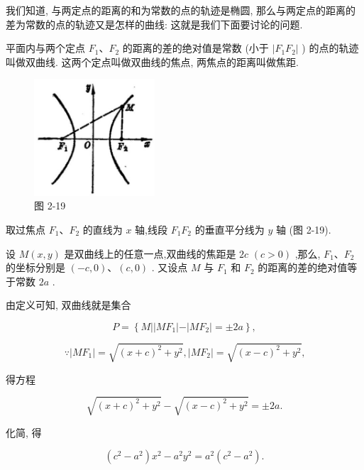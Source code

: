 \documentclass[lang=cn,newtx,10.5pt,scheme=chinese]{elegantbook}
\begin{document}
我们知道, 与两定点的距离的和为常数的点的轨迹是椭圆, 那么与两定点的距离的差为常数的点的轨迹又是怎样的曲线: 这就是我们下面要讨论的问题.
\begin{definition}[双曲线] 
平面内与两个定点 \({F}_{1}\text{、}{F}_{2}\) 的距离的差的绝对值是常数 (小于 \(\left| {{F}_{1}{F}_{2}}\right|\) ) 的点的轨迹叫做双曲线. 这两个定点叫做双曲线的焦点, 两焦点的距离叫做焦距.
\end{definition}

\begin{figure}[h]
  \centering
  \includegraphics[max width=0.4\textwidth]{images/01912cc2-ffb6-728e-9ae7-b113ff05c64b_97_983208.jpg}
  \caption{图 2-19}
\end{figure}



取过焦点 \({F}_{1}\text{、}{F}_{2}\) 的直线为 \(x\) 轴,线段 \({F}_{1}{F}_{2}\) 的垂直平分线为 \(y\) 轴 (图 2-19).

设 \(M\left( {x,y}\right)\) 是双曲线上的任意一点,双曲线的焦距是 \({2c}\) \(\left( {c > 0}\right)\) ,那么, \({F}_{1}\text{、}{F}_{2}\) 的坐标分别是 \(\left( {-c,0}\right) \text{、}\left( {c,0}\right)\) . 又设点 \(M\) 与 \({F}_{1}\) 和 \({F}_{2}\) 的距离的差的绝对值等于常数 \({2a}\) .

由定义可知, 双曲线就是集合

\[
  P = \left\{ {M\left| \right| M{F}_{1}\left| -\right| M{F}_{2} \mid = \pm {2a}}\right\} ,
\]

\[
  \because \left| {M{F}_{1}}\right| = \sqrt{{\left( x + c\right) }^{2} + {y}^{2}},\left| {M{F}_{2}}\right| = \sqrt{{\left( x - c\right) }^{2} + {y}^{2}}\text{,}
\]

得方程

\[
  \sqrt{{\left( x + c\right) }^{2} + {y}^{2}} - \sqrt{{\left( x - c\right) }^{2} + {y}^{2}} = \pm {2a}.
\]

化简, 得

\[
  \left( {{c}^{2} - {a}^{2}}\right) {x}^{2} - {a}^{2}{y}^{2} = {a}^{2}\left( {{c}^{2} - {a}^{2}}\right) .
\]
\end{document}
